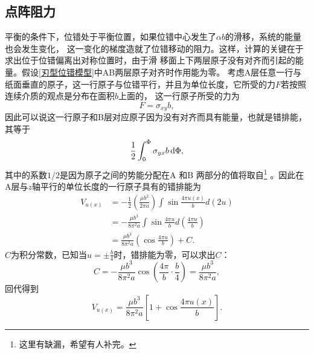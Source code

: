             \subsection{点阵阻力}\label{subsection:点阵阻力}
                平衡的条件下，位错处于平衡位置，如果位错中心发生了$\alpha b$的滑移，系统的能量也会发生变化，
                这一变化的梯度造就了位错移动的阻力。这样，计算的关键在于求出位于位错偏离出对称位置时，由于滑
                移面上下两层原子没有对齐而引起的能量。假设\autoref{刃型位错模型}中AB两层原子对齐时作用能为零。
                考虑A层任意一行与纸面垂直的原子，这一行原子与位错平行，并且为单位长度，它所受的力$F$若按照
                连续介质的观点是分布在面积$b$上面的，
                这一行原子所受的力为
                \begin{equation}
                    F=\sigma_{xy}b\label{位错核心受到的力与柏式矢量关系},
                \end{equation}
                因此可以说这一行原子和B层对应原子因为没有对齐而具有能量，也就是错排能，其等于
                \begin{equation}
                    \frac{1}{2}\int_{0}^{\Phi}\sigma_{yx}b\mathop{}\!\mathrm{d} \Phi,
                \end{equation}
                其中的系数$1/2$是因为原子之间的势能分配在A 和B 两部分的值将取自\footnote{这里有缺漏，希望有人补完。}
                。因此在A层与$z$轴平行的单位长度的一行原子具有的错排能为
                \begin{equation}
                    \begin{aligned}
                        V_{u(x)}&=-\frac{1}{2}\left(\frac{\mu b^{2}}{2 \pi a}\right) \int \sin \frac{4 \pi u(x)}{b} d(2 u) \\ 
                            &=-\frac{\mu b^{3}}{8 \pi^{2} a} \int \sin \frac{4 \pi u}{b} d\left(\frac{4 \pi u}{b}\right) \\ 
                            &=\frac{\mu b^{3}}{8 \pi^{2} a}\left(\cos \frac{4 \pi u}{b}\right)+C.
                    \end{aligned}
                \end{equation}
                $C$为积分常数，已知当$u=\pm\frac{b}{4}$时，错排能为零，可以求出$C$：
                \begin{equation}
                    C=-\frac{\mu b^{3}}{8 \pi^{2} a} \cos \left(\frac{4 \pi}{b} \cdot \frac{b}{4}\right)=\frac{\mu b^{3}}{8 \pi^{2} a},
                \end{equation}
                回代得到
                \begin{equation}
                    V_{u(x)}=\frac{\mu b^{3}}{8 \pi^{2} a}\left[1+\cos \frac{4 \pi u(x)}{b}\right].
                \end{equation}
